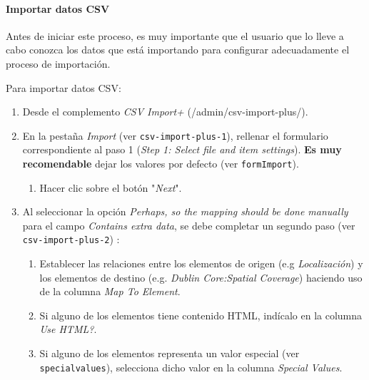 \documentclass[
]{article}
\providecommand{\tightlist}{%
  \setlength{\itemsep}{0pt}\setlength{\parskip}{0pt}}
\begin{document}
\hypertarget{importar-datos-csv}{%
\paragraph{Importar datos CSV}\label{importar-datos-csv}}

Antes de iniciar este proceso, es muy importante que el usuario que lo
lleve a cabo conozca los datos que está importando para configurar
adecuadamente el proceso de importación.

Para importar datos CSV:

\begin{enumerate}
\def\labelenumi{\arabic{enumi}.}
\tightlist
\item
  Desde el complemento \emph{CSV Import+} ({/admin/csv-import-plus/}).
\item
  En la pestaña \emph{Import} (ver \texttt{csv-import-plus-1}), rellenar
  el formulario correspondiente al paso 1 (\emph{Step 1: Select file and
  item settings}). \textbf{Es muy recomendable} dejar los valores por
  defecto (ver \texttt{formImport}).

  \begin{enumerate}
  \def\labelenumii{\alph{enumii}.}
  \tightlist
  \item
    Hacer clic sobre el botón "\emph{Next}".
  \end{enumerate}
\item
  Al seleccionar la opción \emph{Perhaps, so the mapping should be done
  manually} para el campo \emph{Contains extra data}, se debe completar
  un segundo paso (ver \texttt{csv-import-plus-2}) :

  \begin{enumerate}
  \def\labelenumii{\alph{enumii}.}
  \tightlist
  \item
    Establecer las relaciones entre los elementos de origen (e.g
    \emph{Localización}) y los elementos de destino (e.g. \emph{Dublin
    Core:Spatial Coverage}) haciendo uso de la columna \emph{Map To
    Element}.
  \item
    Si alguno de los elementos tiene contenido HTML, indícalo en la
    columna \emph{Use HTML?}.
  \item
    Si alguno de los elementos representa un valor especial (ver
    \texttt{specialvalues}), selecciona dicho valor en la columna
    \emph{Special Values}.


\end{enumerate}
\end{enumerate}
\end{document}
